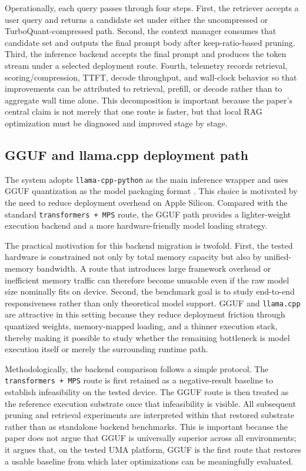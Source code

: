 \documentclass[10pt,twocolumn]{article}
\begin{document}
Operationally, each query passes through four steps. First, the retriever accepts a user query and returns a candidate set under either the uncompressed or TurboQuant-compressed path. Second, the context manager consumes that candidate set and outputs the final prompt body after keep-ratio-based pruning. Third, the inference backend accepts the final prompt and produces the token stream under a selected deployment route. Fourth, telemetry records retrieval, scoring/compression, TTFT, decode throughput, and wall-clock behavior so that improvements can be attributed to retrieval, prefill, or decode rather than to aggregate wall time alone. This decomposition is important because the paper's central claim is not merely that one route is faster, but that local RAG optimization must be diagnosed and improved stage by stage.

\subsection{GGUF and llama.cpp deployment path}

The system adopts \texttt{llama-cpp-python} as the main inference wrapper and uses GGUF quantization as the model packaging format \cite{ggml2026llamacpp,ggml2026gguf}. This choice is motivated by the need to reduce deployment overhead on Apple Silicon. Compared with the standard \texttt{transformers + MPS} route, the GGUF path provides a lighter-weight execution backend and a more hardware-friendly model loading strategy.

The practical motivation for this backend migration is twofold. First, the tested hardware is constrained not only by total memory capacity but also by unified-memory bandwidth. A route that introduces large framework overhead or inefficient memory traffic can therefore become unusable even if the raw model size nominally fits on device. Second, the benchmark goal is to study end-to-end responsiveness rather than only theoretical model support. GGUF and \texttt{llama.cpp} are attractive in this setting because they reduce deployment friction through quantized weights, memory-mapped loading, and a thinner execution stack, thereby making it possible to study whether the remaining bottleneck is model execution itself or merely the surrounding runtime path.

Methodologically, the backend comparison follows a simple protocol. The \texttt{transformers + MPS} route is first retained as a negative-result baseline to establish infeasibility on the tested device. The GGUF route is then treated as the reference execution substrate once that infeasibility is visible. All subsequent pruning and retrieval experiments are interpreted within that restored substrate rather than as standalone backend benchmarks. This is important because the paper does not argue that GGUF is universally superior across all environments; it argues that, on the tested UMA platform, GGUF is the first route that restores a usable baseline from which later optimizations can be meaningfully evaluated.
\end{document}
